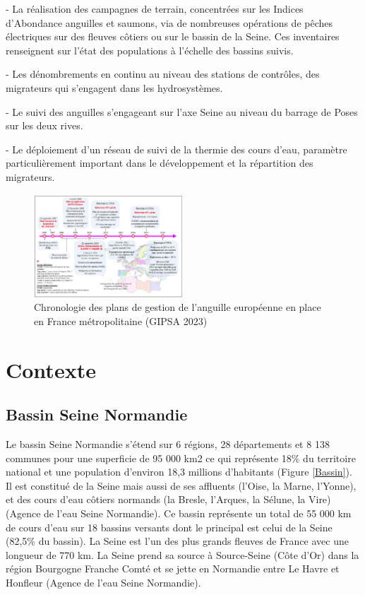 \documentclass[11pt,titlepage,twoside]{article}\usepackage[]{graphicx}\usepackage[table]{xcolor}
\begin{document}
- La réalisation des campagnes de terrain, concentrées sur les Indices d’Abondance anguilles et saumons, via de nombreuses opérations de pêches électriques sur des fleuves côtiers ou sur le bassin de la Seine. Ces inventaires renseignent sur l’état des populations à l’échelle des bassins suivis. 

- Les dénombrements en continu au niveau des stations de contrôles, des migrateurs qui s’engagent dans les hydrosystèmes. 

- Le suivi des anguilles s’engageant sur l’axe Seine au niveau du barrage de Poses sur les deux rives. 

- Le déploiement d’un réseau de suivi de la thermie des cours d’eau, paramètre particulièrement important dans le développement et la répartition des migrateurs. 

\begin{figure}[htpb]
\centering
\includegraphics[width=0.5\textwidth]{PGA}
\caption{Chronologie des plans de gestion de l’anguille européenne en place en France métropolitaine (GIPSA 2023)}
\label{PGA}
\end{figure}

\section{Contexte}

\subsection{Bassin Seine Normandie}


Le bassin Seine Normandie s’étend sur 6 régions, 28 départements et 8 138 communes pour une superficie de 95 000 km2 ce qui représente 18\% du territoire national et une population d’environ 18,3 millions d’habitants (Figure \ref{Bassin}). Il est constitué de la Seine mais aussi de ses affluents (l’Oise, la Marne, l’Yonne), et des cours d’eau côtiers normands (la Bresle, l’Arques, la Sélune, la Vire) (Agence de l’eau Seine Normandie). Ce bassin représente un total de 55 000 km de cours d’eau sur 18 bassins versants dont le principal est celui de la Seine (82,5\% du bassin). La Seine est l’un des plus grands fleuves de France avec une longueur de 770 km. La Seine prend sa source à Source-Seine (Côte d’Or) dans la région Bourgogne Franche Comté et se jette en Normandie entre Le Havre et Honfleur (Agence de l’eau Seine Normandie).
\end{document}
